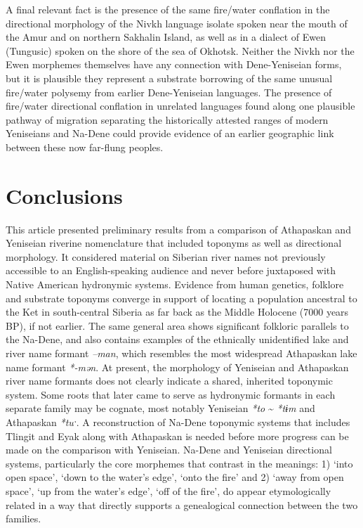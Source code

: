 A final relevant fact is the presence of the same fire/water conflation in the directional morphology of the Nivkh language isolate spoken near the mouth of the Amur and on northern Sakhalin Island, as well as in a dialect of Ewen (Tungusic) spoken on the shore of the sea of Okhotsk. Neither the Nivkh nor the Ewen morphemes themselves have any connection with Dene-Yeniseian forms, but it is plausible they represent a substrate borrowing of the same unusual fire/water polysemy from earlier Dene-Yeniseian languages. The presence of fire/water directional conflation in unrelated languages found along one plausible pathway of migration separating the historically attested ranges of modern Yeniseians and Na-Dene could provide evidence of an earlier geographic link between these now far-flung peoples.

\section{Conclusions}\label{vajda:sec:4}

This article presented preliminary results from a comparison of Athapaskan and Yeniseian riverine nomenclature that included toponyms as well as directional morphology. It considered material on Siberian river names not previously accessible to an English-speaking audience and never before juxtaposed with Native American hydronymic systems. Evidence from human genetics, folklore and substrate toponyms converge in support of locating a population ancestral to the Ket in south-central Siberia as far back as the Middle Holocene (7000 years BP), if not earlier. The same general area shows significant folkloric parallels to the Na-Dene, and also contains examples of the ethnically unidentified lake and river name formant \textit{–man}, which resembles the most widespread Athapaskan lake name formant\textit{ *-mən}. At present, the morphology of Yeniseian and Athapaskan river name formants does not clearly indicate a shared, inherited toponymic system. Some roots that later came to serve as hydronymic formants in each separate family may be cognate, most notably Yeniseian \textit{*to} \~{} \textit{*tɨm} and Athapaskan \textit{*tuˑ}. A reconstruction of Na-Dene toponymic systems that includes Tlingit and Eyak along with Athapaskan is needed before more progress can be made on the comparison with Yeniseian. Na-Dene and Yeniseian directional systems, particularly the core morphemes that contrast in the meanings: 1) ‘into open space’, ‘down to the water’s edge’, ‘onto the fire’ and 2) ‘away from open space’, ‘up from the water’s edge’, ‘off of the fire’, do appear etymologically related in a way that directly supports a genealogical connection between the two families.

